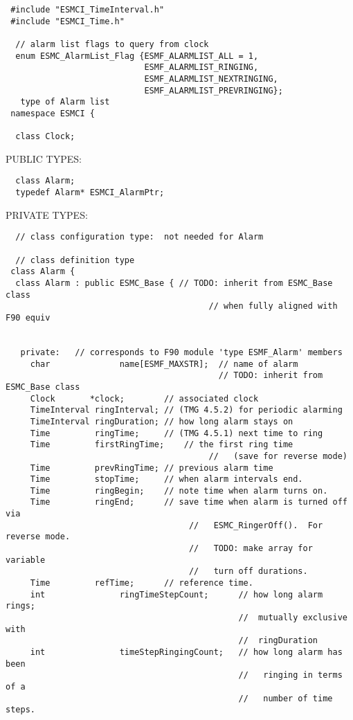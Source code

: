\begin{verbatim} #include "ESMCI_TimeInterval.h"
 #include "ESMCI_Time.h"
 
  // alarm list flags to query from clock
  enum ESMC_AlarmList_Flag {ESMF_ALARMLIST_ALL = 1,
                            ESMF_ALARMLIST_RINGING,   
                            ESMF_ALARMLIST_NEXTRINGING,
                            ESMF_ALARMLIST_PREVRINGING};
   type of Alarm list
 namespace ESMCI {
 
  class Clock;
 \end{verbatim}{\sf PUBLIC TYPES:}
\begin{verbatim}  class Alarm;
  typedef Alarm* ESMCI_AlarmPtr;
 \end{verbatim}{\sf PRIVATE TYPES:}
\begin{verbatim}  // class configuration type:  not needed for Alarm
 
  // class definition type
 class Alarm {
  class Alarm : public ESMC_Base { // TODO: inherit from ESMC_Base class
                                         // when fully aligned with F90 equiv
 
 
   private:   // corresponds to F90 module 'type ESMF_Alarm' members
     char              name[ESMF_MAXSTR];  // name of alarm
                                           // TODO: inherit from ESMC_Base class
     Clock       *clock;        // associated clock
     TimeInterval ringInterval; // (TMG 4.5.2) for periodic alarming
     TimeInterval ringDuration; // how long alarm stays on
     Time         ringTime;     // (TMG 4.5.1) next time to ring
     Time         firstRingTime;    // the first ring time
                                         //   (save for reverse mode)
     Time         prevRingTime; // previous alarm time 
     Time         stopTime;     // when alarm intervals end.
     Time         ringBegin;    // note time when alarm turns on.
     Time         ringEnd;      // save time when alarm is turned off via
                                     //   ESMC_RingerOff().  For reverse mode.
                                     //   TODO: make array for variable
                                     //   turn off durations.
     Time         refTime;      // reference time.
     int               ringTimeStepCount;      // how long alarm rings;
                                               //  mutually exclusive with
                                               //  ringDuration
     int               timeStepRingingCount;   // how long alarm has been
                                               //   ringing in terms of a 
                                               //   number of time steps.
 

\end{verbatim}
